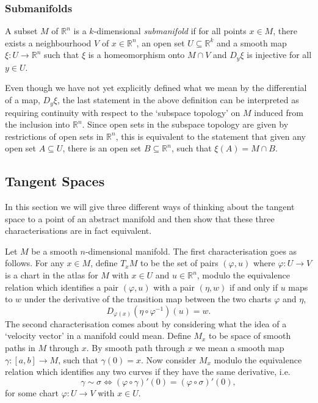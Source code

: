 \subsubsection{Submanifolds}
\begin{definition}
A subset $M$ of $\mathbb{R}^n$ is a $k$-dimensional \textit{submanifold} if for all points $x\in M$, there exists a neighbourhood $V$ of $x\in\mathbb{R}^n$, an open set $U\subseteq\mathbb{R}^k$ and a smooth map $\xi:U\to\mathbb{R}^n$ such that $\xi$ is a homeomorphism onto $M\cap V$ and $D_y\xi$ is injective for all $y\in U$. 
\end{definition}
Even though we have not yet explicitly defined what we mean by the differential of a map, $D_y\xi$, the last statement in the above definition can be interpreted as requiring continuity with respect to the `subspace topology' on $M$ induced from the inclusion into $\mathbb{R}^n$. Since open sets in the subspace topology are given by restrictions of open sets in $\mathbb{R}^n$, this is equivalent to the statement that given any open set $A\subseteq U$, there is an open set $B\subseteq\mathbb{R}^n$, such that $\xi(A)=M\cap B$.
\subsection{Tangent Spaces}

In this section we will give three different ways of thinking about the tangent space to a point of an abstract manifold and then show that these three characterisations are in fact equivalent.

Let $M$ be a smooth $n$-dimensional manifold. The first characterisation goes as follows. For any $x\in M$, define $T_xM$ to be the set of pairs $(\varphi,u)$ where $\varphi:U\to V$ is a chart in the atlas for $M$ with $x\in U$ and $u\in\mathbb{R}^n$, modulo the equivalence relation which identifies a pair $(\varphi,u)$ with a pair $(\eta,w)$ if and only if $u$ maps to $w$ under the derivative of the transition map between the two charts $\varphi$ and $\eta$,
\[
D_{\varphi(x)}(\eta\circ\varphi^{-1})(u)=w.
\]
The second characterisation comes about by considering what the idea of a `velocity vector' in a manifold could mean. Define $M_x$ to be space of smooth paths in $M$ through $x$. By smooth path through $x$ we mean a smooth map $\gamma:[a,b]\to M$, such that $\gamma(0)=x$. Now consider $M_x$ modulo the equivalence relation which identifies any two curves if they have the same derivative, i.e. 
\[
\gamma\sim\sigma\Leftrightarrow(\varphi\circ\gamma)'(0)=(\varphi\circ\sigma)'(0),
\] 
for some chart $\varphi:U\to V$ with $x\in U$. 

